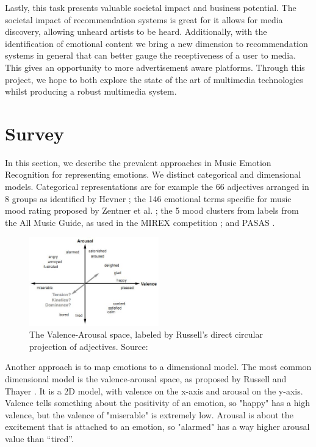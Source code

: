 \documentclass[10pt,journal,compsoc]{IEEEtran}
\begin{document}
Lastly, this task presents valuable societal impact and business potential. The societal impact of recommendation systems is great for it allows for media discovery, allowing unheard artists to be heard. Additionally, with the identification of emotional content we bring a new dimension to recommendation systems in general that can better gauge the receptiveness of a user to media. This gives an opportunity to more advertisement aware platforms. Through this project, we hope to both explore the state of the art of multimedia technologies whilst producing a robust multimedia system.

\section{Survey}
In this section, we describe the prevalent approaches in Music Emotion Recognition for representing emotions. We distinct categorical and dimensional models. Categorical representations are for example the 66 adjectives arranged in 8 groups as identified by Hevner \cite{Hevner}; the 146 emotional terms specific for music mood rating proposed by Zentner et al. \cite{Zentner}; the 5 mood clusters from labels from the All Music Guide, as used in the MIREX competition \cite{Hu}; and PASAS \cite{Watson}.
\begin{figure}[h!]
	\centering
	\includegraphics[width=0.5\textwidth]{"Figure1_ValenceArousal"}
	\caption{The Valence-Arousal space, labeled by Russell's direct circular projection of adjectives. Source: \cite{Russel}}
	\label{fig:va}
\end{figure}

Another approach is to map emotions to a dimensional model. The most common dimensional model is the valence-arousal space, as proposed by Russell and Thayer \cite{Russel}. It is a 2D model, with valence on the x-axis and arousal on the y-axis. Valence tells something about the positivity of an emotion, so "happy" has a high valence, but the valence of "miserable" is extremely low. Arousal is about the excitement that is attached to an emotion, so "alarmed" has a way higher arousal value than “tired”.
\end{document}
